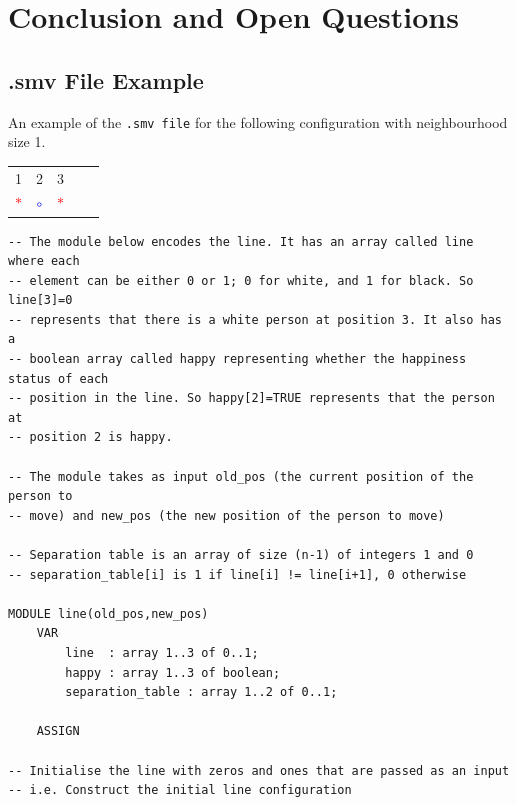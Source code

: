 \documentclass[twoside,openright]{article}
\let\oldsection\section%
\renewcommand{\section}{\cleardoublepage\oldsection}%
\newcommand{\x}{\textbf{\textcolor{red}{$\ast$}}} %
\newcommand{\z}{\textbf{\textcolor{blue}{$\circ$}}} %
\newcommand\blankpage{%
    \null
    \thispagestyle{empty}%
    \newpage}
\begin{document}
\newpage
\section{Conclusion and Open Questions}



\afterpage{\blankpage}
\newpage




\newpage
\begin{appendices}

\section{.smv File Example}
\label{appendix:smv}
An example of the \verb|.smv file| for the following configuration with neighbourhood size 1.
\begin{table}[H]
\begin{center}
{\begin{tabular}{| c |c| c| c| c | }
\hline
1 & 2 &3 \\
\x & \z &\x   \\
 \hline
\end{tabular}}
\end{center}
\end{table}

\begin{lstlisting}
-- The module below encodes the line. It has an array called line where each
-- element can be either 0 or 1; 0 for white, and 1 for black. So line[3]=0
-- represents that there is a white person at position 3. It also has a
-- boolean array called happy representing whether the happiness status of each
-- position in the line. So happy[2]=TRUE represents that the person at
-- position 2 is happy.

-- The module takes as input old_pos (the current position of the person to
-- move) and new_pos (the new position of the person to move)

-- Separation table is an array of size (n-1) of integers 1 and 0
-- separation_table[i] is 1 if line[i] != line[i+1], 0 otherwise

MODULE line(old_pos,new_pos)
	VAR
		line  : array 1..3 of 0..1;
		happy : array 1..3 of boolean;
		separation_table : array 1..2 of 0..1;

	ASSIGN

-- Initialise the line with zeros and ones that are passed as an input
-- i.e. Construct the initial line configuration


\end{lstlisting}
\end{appendices}
\end{document}
